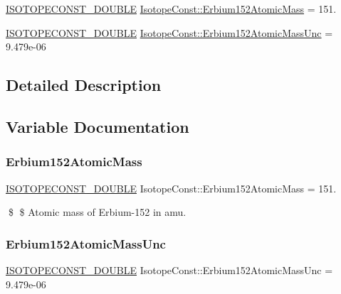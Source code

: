 \begin{DoxyCompactItemize}
\item 
\mbox{\hyperlink{group___isotope_const-_macros_ga8f45a7272ce02c0b4c65c44636ed719a}{I\+S\+O\+T\+O\+P\+E\+C\+O\+N\+S\+T\+\_\+\+D\+O\+U\+B\+LE}} \mbox{\hyperlink{group___isotope_const-_erbium-_er152_ga295ed36ee25a137a7ee18b8050428b5c}{Isotope\+Const\+::\+Erbium152\+Atomic\+Mass}} = 151.
\item 
\mbox{\hyperlink{group___isotope_const-_macros_ga8f45a7272ce02c0b4c65c44636ed719a}{I\+S\+O\+T\+O\+P\+E\+C\+O\+N\+S\+T\+\_\+\+D\+O\+U\+B\+LE}} \mbox{\hyperlink{group___isotope_const-_erbium-_er152_ga16580ed1b2f3834e7724718ae0d0cb64}{Isotope\+Const\+::\+Erbium152\+Atomic\+Mass\+Unc}} = 9.\+479e-\/06
\end{DoxyCompactItemize}


\subsection{Detailed Description}


\subsection{Variable Documentation}
\mbox{\label{group___isotope_const-_erbium-_er152_ga295ed36ee25a137a7ee18b8050428b5c}} 
\subsubsection{\texorpdfstring{Erbium152\+Atomic\+Mass}{Erbium152AtomicMass}}
{\footnotesize\ttfamily \mbox{\hyperlink{group___isotope_const-_macros_ga8f45a7272ce02c0b4c65c44636ed719a}{I\+S\+O\+T\+O\+P\+E\+C\+O\+N\+S\+T\+\_\+\+D\+O\+U\+B\+LE}} Isotope\+Const\+::\+Erbium152\+Atomic\+Mass = 151.}

\$ \$ Atomic mass of Erbium-\/152 in amu. \mbox{\label{group___isotope_const-_erbium-_er152_ga16580ed1b2f3834e7724718ae0d0cb64}} 
\subsubsection{\texorpdfstring{Erbium152\+Atomic\+Mass\+Unc}{Erbium152AtomicMassUnc}}
{\footnotesize\ttfamily \mbox{\hyperlink{group___isotope_const-_macros_ga8f45a7272ce02c0b4c65c44636ed719a}{I\+S\+O\+T\+O\+P\+E\+C\+O\+N\+S\+T\+\_\+\+D\+O\+U\+B\+LE}} Isotope\+Const\+::\+Erbium152\+Atomic\+Mass\+Unc = 9.\+479e-\/06}

